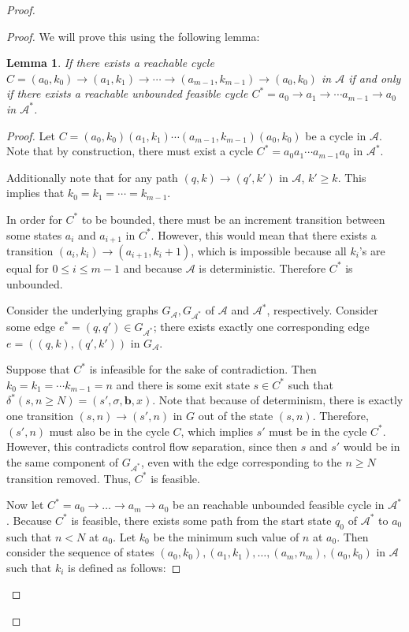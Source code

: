 \documentclass[12pt]{article}
\newtheorem{lemma}[thm]{Lemma}
\theoremstyle{definition}
\begin{document}
\begin{proof}
\begin{proof}
	We will prove this using the following lemma: 
	\begin{lemma}
		If there exists a reachable cycle $C = (a_0, k_0)\to (a_1, k_1)\to \cdots \to (a_{m-1}, k_{m-1})\to (a_0, k_0)$ in $\mathcal{A}$ if and only if there exists a reachable unbounded feasible cycle $C^* = a_0\to a_1\to \cdots a_{m-1}\to a_0$ in $\mathcal{A}^*$.
	\end{lemma}

	\begin{proof}

		Let $C = (a_0, k_0)(a_1, k_1)\cdots (a_{m-1}, k_{m-1})(a_0, k_0)$ be a cycle in $\mathcal{A}$. Note that by construction, there must exist a cycle $C^*=a_0a_1\cdots a_{m-1}a_0$ in $\mathcal{A}^*$.

		Additionally note that for any path $(q, k) \to (q', k')$ in $\mathcal{A}$, $k' \geq k$. This implies that $k_0 = k_1 = \cdots = k_{m-1}$. 

		In order for $C^*$ to be bounded, there must be an increment transition between some states $a_i$ and $a_{i+1}$ in $C^*$. However, this would mean that there exists a transition  $(a_i, k_i)\to (a_{i+1}, k_i + 1)$, which is impossible because all $k_i$'s are equal for $ 0\leq i \leq m-1$ and because $\mathcal{A}$ is deterministic. Therefore $C^*$ is unbounded.

		Consider the underlying graphs $G_\mathcal{A}, G_{\mathcal{A}^*}$ of $\mathcal{A}$ and $\mathcal{A}^*$, respectively. Consider some edge $e^* = (q, q')\in G_{\mathcal{A}^*}$; there exists exactly one corresponding edge $e = ((q, k), (q', k'))$ in $G_{\mathcal{A}}$.

		Suppose that $C^*$ is infeasible for the sake of contradiction. Then $k_0 = k_1 = \cdots k_{m-1} = n$ and there is some exit state $s\in C^*$ such that $\delta^*(s, n\geq N) = (s', \sigma, \mathbf{b}, x)$. Note that because of determinism, there is exactly one transition $(s, n)\to (s', n)$ in $G$ out of the state $(s, n)$. 
		Therefore, $(s', n)$ must also be in the cycle $C$, which implies $s'$ must be in the cycle $C^*$. However, this contradicts control flow separation, since then $s$ and $s'$ would be in the same component of $G_{\mathcal{A}^*}$, even with the edge corresponding to the $n\geq N$ transition removed. Thus, $C^*$ is feasible.

		Now let $C^* = a_0 \to \ldots \to a_m \to a_0$ be an reachable unbounded feasible cycle in $\mathcal{A}^*$. Because $C^*$ is feasible, there exists some path from the start state $q_0$ of $\mathcal{A}^*$ to $a_0$ such that $n < N$ at $a_0$. Let $k_0$ be the minimum such value of $n$ at $a_0$. Then consider the sequence of states $(a_0, k_0), (a_1, k_1), \ldots, (a_m, n_m), (a_0, k_0)$ in $\mathcal{A}$ such that $k_i$ is defined as follows:


\end{proof}
\end{proof}
\end{proof}
\end{document}
